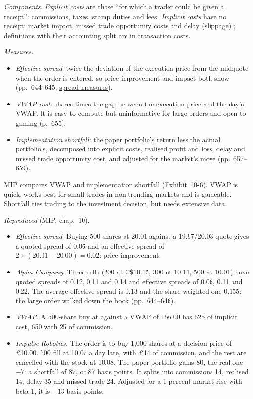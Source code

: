 \begin{qfmethod}\label{meth:execution-cost-measures}
 \emph{Components.} \emph{Explicit costs} are those ``for which a trader could be given a receipt'': commissions, taxes, stamp duties and fees. \emph{Implicit costs} have no receipt: market impact, missed trade opportunity costs and delay (slippage) \citep[chap.~10, sec.~3.1, pp.~654--656]{managing-investment-portfolios-2007}; definitions with their accounting split are in \hyperref[def:transaction-costs]{transaction costs}.

\emph{Measures.}
\begin{itemize}
\item \emph{Effective spread}: twice the deviation of the execution price from the midquote when the order is entered, so price improvement and impact both show (pp.~644--645; \hyperref[def:spread-measures]{spread measures}).
\item \emph{VWAP cost}: shares times the gap between the execution price and the day's VWAP. It is easy to compute but uninformative for large orders and open to gaming (p.~655).
\item \emph{Implementation shortfall}: the paper portfolio's return less the actual portfolio's, decomposed into explicit costs, realised profit and loss, delay and missed trade opportunity cost, and adjusted for the market's move (pp.~657--659).
\end{itemize}
MIP compares VWAP and implementation shortfall (Exhibit~10-6). VWAP is quick, works best for small trades in non-trending markets and is gameable. Shortfall ties trading to the investment decision, but needs extensive data.

 \emph{Reproduced} (MIP, chap.~10).
\begin{itemize}
\item \emph{Effective spread.} Buying 500 shares at 20.01 against a 19.97/20.03 quote gives a quoted spread of 0.06 and an effective spread of $2\times(20.01-20.00)=0.02$: price improvement.
\item \emph{Alpha Company.} Three sells (200 at C\$10.15, 300 at 10.11, 500 at 10.01) have quoted spreads of 0.12, 0.11 and 0.14 and effective spreads of 0.06, 0.11 and 0.22. The average effective spread is 0.13 and the share-weighted one 0.155: the large order walked down the book (pp.~644--646).
\item \emph{VWAP.} A 500-share buy at  against a VWAP of 156.00 has 625 of implicit cost, 650 with 25 of commission.
\item \emph{Impulse Robotics.} The order is to buy 1{,}000 shares at a decision price of \pounds10.00. 700 fill at 10.07 a day late, with \pounds14 of commission, and the rest are cancelled with the stock at 10.08. The paper portfolio gains 80, the real one $-7$: a shortfall of 87, or 87 basis points. It splits into commissions 14, realised 14, delay 35 and missed trade 24. Adjusted for a 1 percent market rise with beta 1, it is $-13$ basis points.
\end{itemize}


\end{qfmethod}
